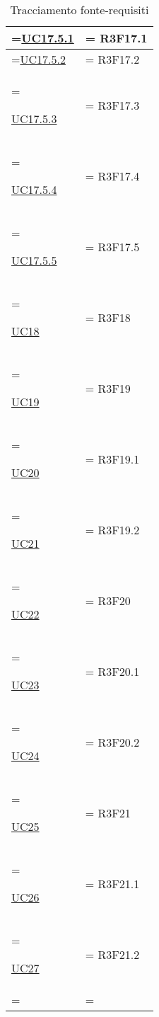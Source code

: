 \begin{xltabular}{0.9\textwidth} {
            >{\hsize\linewidth=\hsize}X
            >{\hsize\linewidth=\hsize}X
            }
            \hyperref[UC17.5.1]{UC17.5.1} &
            R3F17.1 \\
            \hline

            \hyperref[UC17.5.2]{UC17.5.2} &
            R3F17.2 \\
            \hline

            \hyperref[UC17.5.3]{UC17.5.3} &
            R3F17.3 \\
            \hline

            \hyperref[UC17.5.4]{UC17.5.4} &
            R3F17.4 \\
            \hline

            \hyperref[UC17.5.5]{UC17.5.5} &
            R3F17.5 \\
            \hline

            \hyperref[UC18]{UC18} &
            R3F18 \\
            \hline

            \hyperref[UC19]{UC19} &
            R3F19\\
            \hline

            \hyperref[UC20]{UC20} &
            R3F19.1 \\
            \hline

            \hyperref[UC21]{UC21} &
            R3F19.2 \\
            \hline

            \hyperref[UC22]{UC22} &
            R3F20 \\
            \hline

            \hyperref[UC23]{UC23} &
            R3F20.1 \\
            \hline

            \hyperref[UC24]{UC24} &
            R3F20.2 \\
            \hline

            \hyperref[UC25]{UC25} &
            R3F21 \\
            \hline

            \hyperref[UC26]{UC26} &
            R3F21.1 \\
            \hline

            \hyperref[UC27]{UC27} &
            R3F21.2 \\
            \hline

            \caption{Tracciamento fonte-requisiti}
        \end{xltabular}

